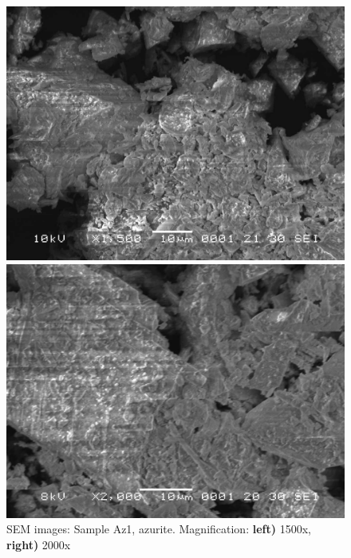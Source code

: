 \begin{figure}[H]
\centering
\begin{minipage}{.45\textwidth}
  \centering
  \includegraphics[width=\linewidth]{Az1_x1500_2_220221}
\end{minipage}
\begin{minipage}{.45\textwidth}
  \centering
  \includegraphics[width=\linewidth]{Az1_x2000_4_220221}
\end{minipage}
\caption[SEM images: Sample Az1, azurite]{SEM images: Sample Az1, azurite. Magnification: \textbf{left)} 1500x, \textbf{right)} 2000x}
\label{fig:az1_sem_2}
\end{figure}



